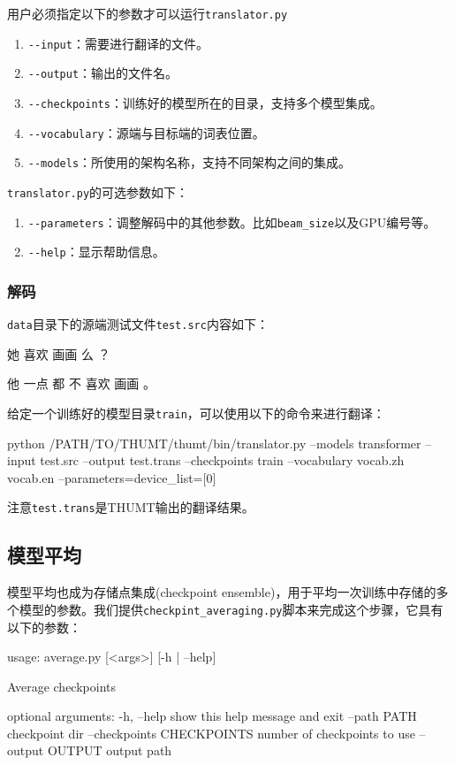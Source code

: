 \documentclass{article}
\begin{document}
用户必须指定以下的参数才可以运行\verb|translator.py|

\begin{enumerate}
\item \verb|--input|：需要进行翻译的文件。
\item \verb|--output|：输出的文件名。
\item \verb|--checkpoints|：训练好的模型所在的目录，支持多个模型集成。
\item \verb|--vocabulary|：源端与目标端的词表位置。
\item \verb|--models|：所使用的架构名称，支持不同架构之间的集成。
\end{enumerate}

\verb|translator.py|的可选参数如下：
\begin{enumerate}
\item \verb|--parameters|：调整解码中的其他参数。比如\verb|beam_size|以及GPU编号等。
\item \verb|--help|：显示帮助信息。
\end{enumerate}

\subsubsection{解码}
\verb|data|目录下的源端测试文件\verb|test.src|内容如下：
\begin{everbatim}
她 喜欢 画画 么 ？

他 一点 都 不 喜欢 画画 。

\end{everbatim}

给定一个训练好的模型目录\verb|train|，可以使用以下的命令来进行翻译：

\begin{everbatim}
python /PATH/TO/THUMT/thumt/bin/translator.py
  --models transformer
  --input test.src
  --output test.trans
  --checkpoints train
  --vocabulary vocab.zh vocab.en
  --parameters=device_list=[0]
\end{everbatim}
注意\verb|test.trans|是THUMT输出的翻译结果。


\subsection{模型平均}
模型平均也成为存储点集成(checkpoint ensemble)，用于平均一次训练中存储的多个模型的参数。我们提供\verb|checkpint_averaging.py|脚本来完成这个步骤，它具有以下的参数：
\begin{everbatim}
usage: average.py [<args>] [-h | --help]

Average checkpoints

optional arguments:
  -h, --help            show this help message and exit
  --path PATH           checkpoint dir
  --checkpoints CHECKPOINTS
                        number of checkpoints to use
  --output OUTPUT       output path
\end{everbatim}
\end{document}
